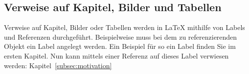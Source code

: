 \subsection{Verweise auf Kapitel, Bilder und Tabellen}

Verweise auf Kapitel, Bilder oder Tabellen werden in LaTeX mithilfe von Labels und Referenzen durchgeführt.
Beispielweise muss bei dem zu referenzierenden Objekt ein Label angelegt werden.
Ein Beispiel für so ein Label finden Sie im ersten Kapitel.
Nun kann mittels einer Referenz auf dieses Label verwiesen werden: Kapitel~\ref{subsec:motivation}




